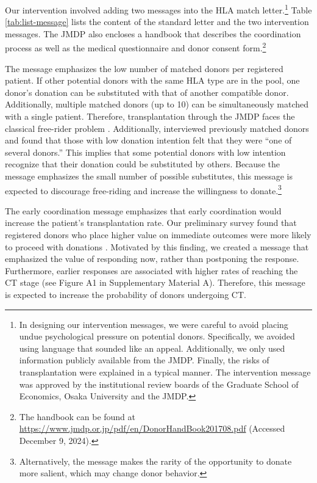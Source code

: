 \documentclass[12pt, a4paper]{article}
\newcommand{\revise}[1]{{\color{red}{#1}}}
\begin{document}
Our intervention involved adding two messages into the HLA match letter.\footnote{In designing our intervention messages, we were careful to avoid placing undue psychological pressure on potential donors. Specifically, we avoided using language that sounded like an appeal. Additionally, we only used information publicly available from the JMDP. Finally, the risks of transplantation were explained in a typical manner. The intervention message was approved by the institutional review boards of the Graduate School of Economics, Osaka University and the JMDP.} Table \ref{tab:list-message} lists the content of the standard letter and the two intervention messages. The JMDP also encloses a handbook that describes the coordination process as well as the medical questionnaire and donor consent form.\footnote{The handbook can be found at \url{https://www.jmdp.or.jp/pdf/en/DonorHandBook201708.pdf} (Accessed December 9, 2024).}

The \revise{matching difficulty} message emphasizes the low number of matched donors per registered patient. If other potential donors with the same HLA type are in the pool, one donor's donation can be substituted with that of another compatible donor. Additionally, multiple matched donors (up to 10) can be simultaneously matched with a single patient. Therefore, transplantation through the JMDP faces the classical free-rider problem \citep{Bergstrom2009}. Additionally, \citet{Kurosawa2022} interviewed previously matched donors and found that those with low donation intention felt that they were ``one of several donors.'' This implies that some potential donors with low intention recognize that their donation could be substituted by others. Because the \revise{matching difficulty} message emphasizes the small number of possible substitutes, this message is expected to discourage free-riding and increase the willingness to donate.\footnote{Alternatively, the \revise{matching difficulty} message makes the rarity of the opportunity to donate more salient, which may change donor behavior.}

The early coordination message emphasizes that early coordination would increase the patient's transplantation rate. Our preliminary survey found that registered donors who place higher value on immediate outcomes were more likely to proceed with donations \citep{Ohtake2020}. Motivated by this finding, we created a message that emphasized the value of responding now, rather than postponing the response. Furthermore, earlier responses are associated with higher rates of reaching the CT stage (see Figure A1 in Supplementary Material A). Therefore, this message is expected to increase the probability of donors undergoing CT.
\end{document}

